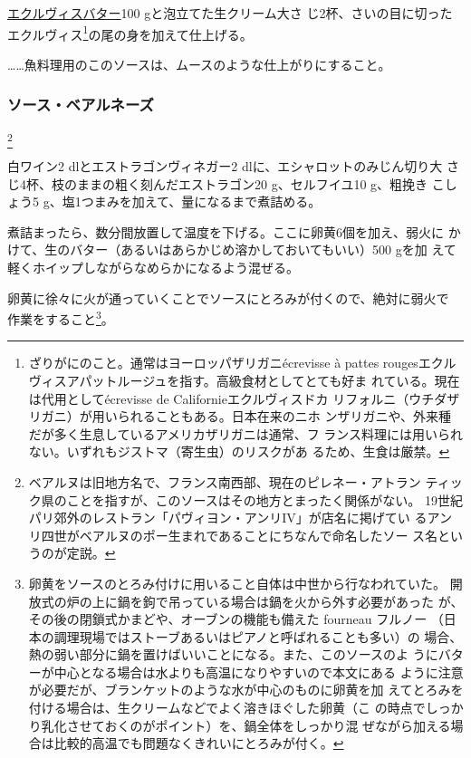 \begin{recette}
\protect\hyperlink{beurre-d-ecrevisse}{エクルヴィスバター}100
gと泡立てた生クリーム大さ じ2杯、さいの目に切ったエクルヴィス\footnote{ざりがにのこと。通常はヨーロッパザリガニécrevisse
  à pattes
  rougesエクルヴィスアパットルージュを指す。高級食材としてとても好ま
  れている。現在は代用としてécrevisse de Californieエクルヴィスドカ
  リフォルニ（ウチダザリガニ）が用いられることもある。日本在来のニホ
  ンザリガニや、外来種だが多く生息しているアメリカザリガニは通常、フ
  ランス料理には用いられない。いずれもジストマ（寄生虫）のリスクがあ
  るため、生食は厳禁。}の尾の身を加えて仕上げる。

\ldots{}\ldots{}魚料理用のこのソースは、ムースのような仕上がりにすること。

\maeaki

\hypertarget{sauce-bearnaise}{%
\subsubsection{ソース・ベアルネーズ}\label{sauce-bearnaise}}

\footnote{ベアルヌは旧地方名で、フランス南西部、現在のピレネー・アトラン
  ティック県のことを指すが、このソースはその地方とまったく関係がない。
  19世紀パリ郊外のレストラン「パヴィヨン・アンリIV」が店名に掲げてい
  るアンリ四世がベアルヌのポー生まれであることにちなんで命名したソー
  ス名というのが定説。}


白ワイン2 dlとエストラゴンヴィネガー2 dlに、エシャロットのみじん切り大
さじ4杯、枝のままの粗く刻んだエストラゴン20 g、セルフイユ10 g、粗挽き
こしょう5 g、塩1つまみを加えて、\untiers{}量になるまで煮詰める。

煮詰まったら、数分間放置して温度を下げる。ここに卵黄6個を加え、弱火に
かけて、生のバター（あるいはあらかじめ溶かしておいてもいい）500 gを加
えて軽くホイップしながらなめらかになるよう混ぜる。

卵黄に徐々に火が通っていくことでソースにとろみが付くので、絶対に弱火で
作業をすること\footnote{卵黄をソースのとろみ付けに用いること自体は中世から行なわれていた。
  開放式の炉の上に鍋を鉤で吊っている場合は鍋を火から外す必要があった
  が、その後の閉鎖式かまどや、オーブンの機能も備えた fourneau フルノー
  （日本の調理現場ではストーブあるいはピアノと呼ばれることも多い）の
  場合、熱の弱い部分に鍋を置けばいいことになる。また、このソースのよ
  うにバターが中心となる場合は水よりも高温になりやすいので本文にある
  ように注意が必要だが、ブランケットのような水が中心のものに卵黄を加
  えてとろみを付ける場合は、生クリームなどでよく溶きほぐした卵黄（こ
  の時点でしっかり乳化させておくのがポイント）を、鍋全体をしっかり混
  ぜながら加える場合は比較的高温でも問題なくきれいにとろみが付く。}。


\end{recette}

